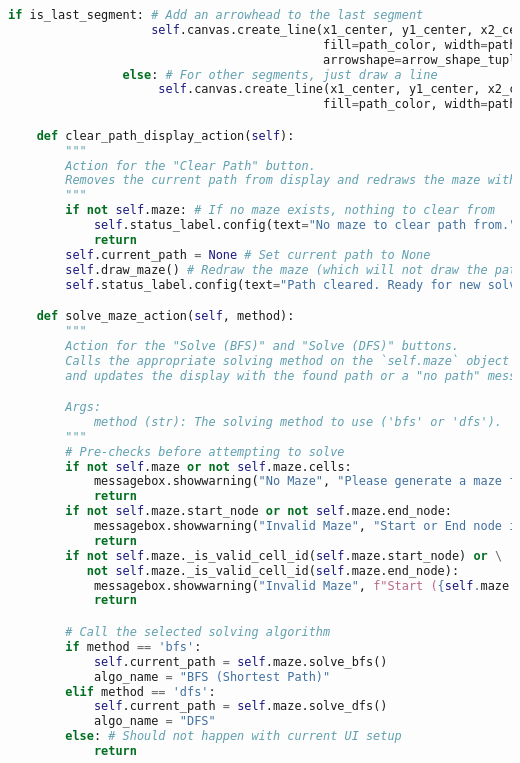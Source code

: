 \documentclass[UTF8]{report}
\theoremstyle{MyLineTheoremStyle} %
\theoremstyle{MyBlockTheoremStyle} %
\theoremstyle{MySubsubsectionStyle} %
\begin{document}
\begin{lstlisting}[language=Python, caption={迷宫生成与求解程序代码}]
                if is_last_segment: # Add an arrowhead to the last segment
                    self.canvas.create_line(x1_center, y1_center, x2_center, y2_center, 
                                            fill=path_color, width=path_width, arrow=tk.LAST, 
                                            arrowshape=arrow_shape_tuple, capstyle=tk.ROUND)
                else: # For other segments, just draw a line
                     self.canvas.create_line(x1_center, y1_center, x2_center, y2_center, 
                                            fill=path_color, width=path_width, capstyle=tk.ROUND)

    def clear_path_display_action(self):
        """
        Action for the "Clear Path" button.
        Removes the current path from display and redraws the maze without it.
        """
        if not self.maze: # If no maze exists, nothing to clear from
            self.status_label.config(text="No maze to clear path from.")
            return
        self.current_path = None # Set current path to None
        self.draw_maze() # Redraw the maze (which will not draw the path if current_path is None)
        self.status_label.config(text="Path cleared. Ready for new solve or generation.")

    def solve_maze_action(self, method):
        """
        Action for the "Solve (BFS)" and "Solve (DFS)" buttons.
        Calls the appropriate solving method on the `self.maze` object
        and updates the display with the found path or a "no path" message.

        Args:
            method (str): The solving method to use ('bfs' or 'dfs').
        """
        # Pre-checks before attempting to solve
        if not self.maze or not self.maze.cells:
            messagebox.showwarning("No Maze", "Please generate a maze first.")
            return
        if not self.maze.start_node or not self.maze.end_node:
            messagebox.showwarning("Invalid Maze", "Start or End node is not set or invalid for the current maze.")
            return
        if not self.maze._is_valid_cell_id(self.maze.start_node) or \
           not self.maze._is_valid_cell_id(self.maze.end_node):
            messagebox.showwarning("Invalid Maze", f"Start ({self.maze.start_node}) or End ({self.maze.end_node}) cell ID is not valid in the current maze cells.")
            return

        # Call the selected solving algorithm
        if method == 'bfs':
            self.current_path = self.maze.solve_bfs()
            algo_name = "BFS (Shortest Path)"
        elif method == 'dfs':
            self.current_path = self.maze.solve_dfs()
            algo_name = "DFS"
        else: # Should not happen with current UI setup
            return


\end{lstlisting}
\end{document}
